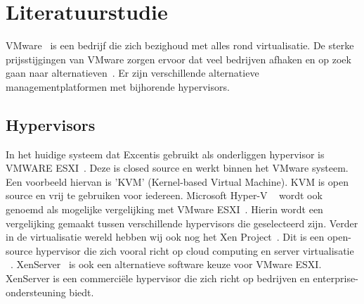 




\section{Literatuurstudie}
\label{sec:literatuurstudie}
VMware~\autocite{vmware} is een bedrijf die zich bezighoud met alles rond virtualisatie. De sterke prijsstijgingen van VMware zorgen ervoor dat veel bedrijven afhaken en op zoek gaan naar alternatieven~\autocite{Hale2024}. Er zijn verschillende alternatieve managementplatformen met bijhorende hypervisors.

\subsection{Hypervisors}
In het huidige systeem dat Excentis gebruikt als onderliggen hypervisor is VMWARE ESXI~\autocite{vmware}. Deze is closed source en werkt binnen het VMware systeem.
Een voorbeeld hiervan is 'KVM' (Kernel-based Virtual Machine)\autocite{KVM}. KVM is open source en vrij te gebruiken voor iedereen\autocite{KVM}. Microsoft Hyper-V ~\autocite{Eaton2019} wordt ook genoemd als mogelijke vergelijking met VMware ESXI~\autocite{fayyad2013benchmarking}. Hierin wordt een vergelijking gemaakt tussen verschillende hypervisors die geselecteerd zijn.
Verder in de virtualisatie wereld hebben wij ook nog het Xen Project~\autocite{xenproject}. Dit is een open-source hypervisor die zich vooral richt op cloud computing en server virtualisatie ~\autocite{binu2011virtualization}.
XenServer~\autocite{xenserver} is ook een alternatieve software keuze voor VMware ESXI. XenServer is een commerciële hypervisor die zich richt op bedrijven en enterprise-ondersteuning biedt.

